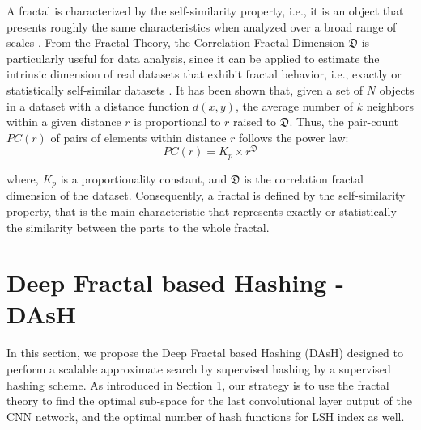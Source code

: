 \documentclass{article}
\begin{document}

 
A fractal is characterized by the self-similarity property, i.e., it is an object that presents roughly the same characteristics when analyzed over a broad range of scales \cite{DBLP:journals/jidm/TrainaTWF10}. From the Fractal Theory, the Correlation Fractal Dimension $\mathfrak{D}$ is particularly useful for data analysis, since it can be applied to estimate the intrinsic dimension of real datasets that exhibit fractal behavior, i.e., exactly or statistically self-similar datasets \cite{DBLP:fractal2016}.   It has been shown that, given a set of $N$ objects in a dataset with a distance function $d(x,y)$, the average number of $k$ neighbors within a given distance $r$ is proportional to $r$ raised to $\mathfrak{D}$. Thus, the pair-count $PC(r)$ of pairs of elements within distance $r$ follows the power law:
\begin{equation}\label{eq:fractal}
       PC(r) = K_p \times r^{\mathfrak{D}}      
    \end{equation}

     where, $K_p$ is a proportionality constant, and $\mathfrak{D}$ is the correlation fractal dimension of the dataset. 
    Consequently, a fractal is defined by the self-similarity property, that is the main characteristic that represents exactly or statistically  the similarity between the parts to the whole fractal.  
 

\section{Deep Fractal based  Hashing - DAsH}

In this section, we propose the Deep Fractal based  Hashing (DAsH) designed to perform a scalable approximate search by supervised hashing by a supervised hashing scheme. As introduced in Section 1, our strategy is to use the fractal theory to find the optimal sub-space for the last convolutional layer output of the CNN network, and the optimal number of hash functions for LSH index as well. 
\end{document}
